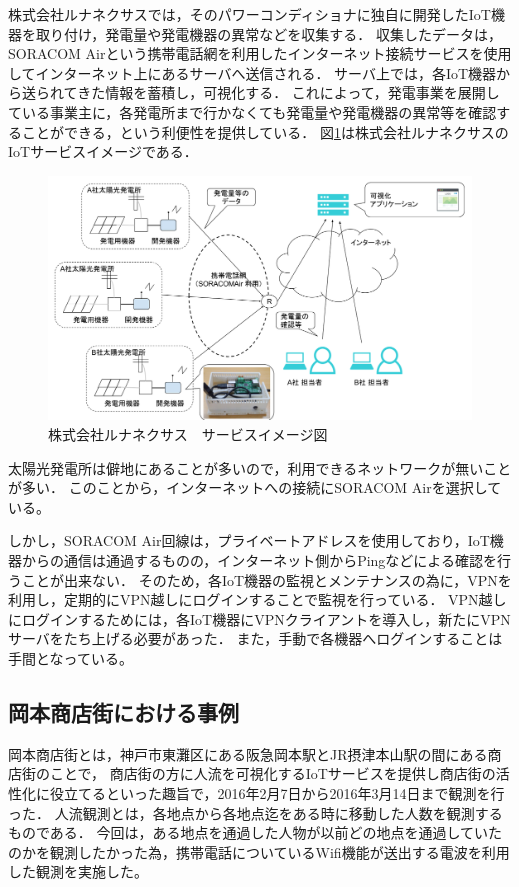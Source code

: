 株式会社ルナネクサスでは，そのパワーコンディショナに独自に開発したIoT機器を取り付け，発電量や発電機器の異常などを収集する．
収集したデータは，SORACOM Airという携帯電話網を利用したインターネット接続サービスを使用してインターネット上にあるサーバへ送信される．
サーバ上では，各IoT機器から送られてきた情報を蓄積し，可視化する．
これによって，発電事業を展開している事業主に，各発電所まで行かなくても発電量や発電機器の異常等を確認することができる，という利便性を提供している．
図\ref{fig:lunafig}は株式会社ルナネクサスのIoTサービスイメージである．
\begin{figure}[htbp]
\includegraphics[width=16cm]{images/lunafig.png}
\caption{株式会社ルナネクサス　サービスイメージ図}
\label{fig:lunafig}
\end{figure}
太陽光発電所は僻地にあることが多いので，利用できるネットワークが無いことが多い．
このことから，インターネットへの接続にSORACOM Airを選択している。
\medskip

しかし，SORACOM Air回線は，プライベートアドレスを使用しており，IoT機器からの通信は通過するものの，インターネット側からPingなどによる確認を行うことが出来ない．
そのため，各IoT機器の監視とメンテナンスの為に，VPNを利用し，定期的にVPN越しにログインすることで監視を行っている．
VPN越しにログインするためには，各IoT機器にVPNクライアントを導入し，新たにVPNサーバをたち上げる必要があった．
また，手動で各機器へログインすることは手間となっている。

\subsection{岡本商店街における事例}
岡本商店街とは，神戸市東灘区にある阪急岡本駅とJR摂津本山駅の間にある商店街のことで，
商店街の方に人流を可視化するIoTサービスを提供し商店街の活性化に役立てるといった趣旨で，2016年2月7日から2016年3月14日まで観測を行った．
人流観測とは，各地点から各地点迄をある時に移動した人数を観測するものである．
今回は，ある地点を通過した人物が以前どの地点を通過していたのかを観測したかった為，携帯電話についているWifi機能が送出する電波を利用した観測を実施した。
\medskip

